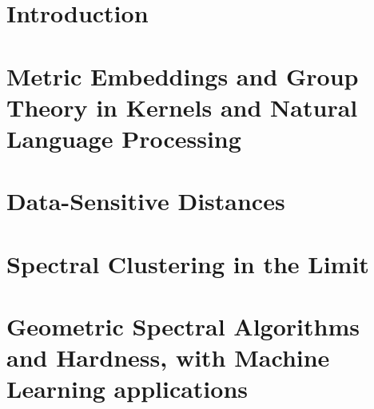 \documentclass[12pt]{cmuthesis}
\begin{document}
\tableofcontents
\listoffigures
\listoftables

\mainmatter


%
%
%
%
%


\chapter{Introduction}

\chapter{Metric Embeddings and Group Theory in Kernels and Natural Language
Processing}\label{sec:ker-main}

\chapter{Data-Sensitive Distances}\label{sec:ds-main}

\chapter{Spectral Clustering in the Limit}\label{sec:spec-main}

\chapter{Geometric Spectral Algorithms and Hardness, with Machine
Learning applications}\label{sec:sgt-main}

%
%
\end{document}

